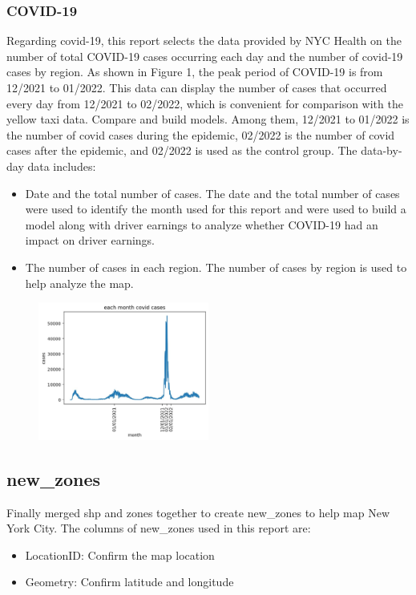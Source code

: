 \documentclass[11pt]{article}
\begin{document}
\subsubsection {COVID-19}
Regarding covid-19, this report selects the data provided by NYC Health on the number of total COVID-19 cases occurring each day and the number of covid-19 cases by region\cite{2}. As shown in Figure 1, the peak period of COVID-19 is from 12/2021 to 01/2022. This data can display the number of cases that occurred every day from 12/2021 to 02/2022, which is convenient for comparison with the yellow taxi data. Compare and build models. Among them, 12/2021 to 01/2022 is the number of covid cases during the epidemic, 02/2022 is the number of covid cases after the epidemic, and 02/2022 is used as the control group. The data-by-day data includes:
\begin{itemize}
    \item Date and the total number of cases. The date and the total number of cases were used to identify the month used for this report and were used to build a model along with driver earnings to analyze whether COVID-19 had an impact on driver earnings.
\end{itemize}
\begin{itemize}
    \item The number of cases in each region. The number of cases by region is used to help analyze the map.
\end{itemize}
\begin{figure}
    \centering
    \includegraphics[width=0.5\textwidth]{plots/each month covid cases}
    \caption{}
    \label{fig:my_label}
\end{figure}
\subsection{new\_zones}
Finally merged shp and zones together to create new\_zones to help map New York City. The columns of new\_zones used in this report are:
\begin{itemize}
    \item LocationID: Confirm the map location
\end{itemize}
\begin{itemize}
    \item Geometry: Confirm latitude and longitude
\end{itemize}
\end{document}
